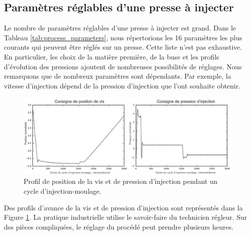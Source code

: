 \subsection{Paramètres réglables d'une presse à injecter} \label{subsec:process_parameters}

Le nombre de paramètres réglables d'une presse à injecter est grand.
Dans le Tableau \ref{tab:process_parameters}, nous répertorions les 16 paramètres les plus courants qui peuvent être réglés sur un presse.
Cette liste n'est pas exhaustive.
En particulier, les choix de la matière première, de la buse et les profils d'évolution des pressions ajoutent de nombreuses possibilités de réglages.
Nous remarquons que de nombreux paramètres sont dépendants.
Par exemple, la vitesse d'injection dépend de la pression d'injection que l'ont souhaite obtenir.

\begin{figure}[bthp]
	\centering
	\includegraphics[width=\textwidth,height=\textheight,keepaspectratio]{../Chap1/Figures/part1_std_signals.png}
	\caption{Profil de position de la vis et de pression d'injection pendant un cycle d'injection-moulage.}
	\label{fig:molding_control}
\end{figure}

Des profils d'avance de la vis et de pression d'injection sont représentés dans la Figure \ref{fig:molding_control}.
La pratique industrielle utilise le savoir-faire du technicien régleur.  %
Sur des pièces compliquées, le réglage du procédé peut prendre plusieurs heures.

\bigskip

\bigskip

